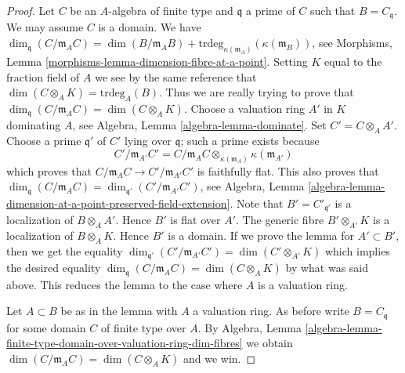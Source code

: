 \documentclass[10pt,a4paper]{amsart}
\theoremstyle{plain}
\theoremstyle{definition}
\theoremstyle{remark}
\numberwithin{equation}{subsection}
\begin{document}
\begin{proof}
Let $C$ be an $A$-algebra of finite type and $\mathfrak q$ a prime of $C$
such that $B = C_{\mathfrak q}$. We may assume $C$ is a domain.
We have
$\dim_{\mathfrak q}(C/\mathfrak m_AC) = \dim(B/\mathfrak m_AB) +
\text{trdeg}_{\kappa(\mathfrak m_A)}(\kappa(\mathfrak m_B))$, see
Morphisms, Lemma \ref{morphisms-lemma-dimension-fibre-at-a-point}.
Setting $K$ equal to the fraction field of $A$
we see by the same reference that
$\dim(C \otimes_A K) = \text{trdeg}_A(B)$.
Thus we are really trying to prove that
$\dim_{\mathfrak q}(C/\mathfrak m_AC) = \dim(C \otimes_A K)$.
Choose a valuation ring $A'$ in $K$ dominating $A$, see
Algebra, Lemma \ref{algebra-lemma-dominate}.
Set $C' = C \otimes_A A'$.
Choose a prime $\mathfrak q'$ of $C'$ lying over $\mathfrak q$; such a
prime exists because
$$
C'/\mathfrak m_{A'}C' =
C/\mathfrak m_AC \otimes_{\kappa(\mathfrak m_A)} \kappa(\mathfrak m_{A'})
$$
which proves that $C/\mathfrak m_AC \to C'/\mathfrak m_{A'}C'$ is faithfully
flat. This also proves that
$\dim_{\mathfrak q}(C/\mathfrak m_AC) =
\dim_{\mathfrak q'}(C'/\mathfrak m_{A'}C')$, see
Algebra,
Lemma \ref{algebra-lemma-dimension-at-a-point-preserved-field-extension}.
Note that $B' = C'_{\mathfrak q'}$ is a localization of $B \otimes_A A'$.
Hence $B'$ is flat over $A'$. The generic fibre $B' \otimes_{A'} K$
is a localization of $B \otimes_A K$. Hence $B'$ is a domain.
If we prove the lemma for $A' \subset B'$, then we get the equality
$\dim_{\mathfrak q'}(C'/\mathfrak m_{A'}C') = \dim(C' \otimes_{A'} K)$
which implies the desired equality
$\dim_{\mathfrak q}(C/\mathfrak m_AC) = \dim(C \otimes_A K)$
by what was said above. This reduces the
lemma to the case where $A$ is a valuation ring.

\medskip\noindent
Let $A \subset B$ be as in the lemma with $A$ a valuation ring.
As before write $B = C_{\mathfrak q}$ for some domain $C$ of finite
type over $A$. By
Algebra,
Lemma \ref{algebra-lemma-finite-type-domain-over-valuation-ring-dim-fibres}
we obtain $\dim(C/\mathfrak m_AC) = \dim(C \otimes_A K)$ and we win.
\end{proof}
\end{document}

